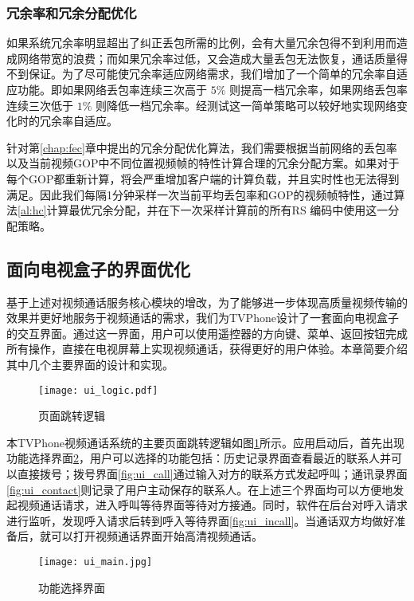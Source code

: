     \subsubsection{冗余率和冗余分配优化}
    如果系统冗余率明显超出了纠正丢包所需的比例，会有大量冗余包得不到利用而造成网络带宽的浪费；而如果冗余率过低，又会造成大量丢包无法恢复，通话质量得不到保证。为了尽可能使冗余率适应网络需求，我们增加了一个简单的冗余率自适应功能。即如果网络丢包率连续三次高于 $5\%$ 则提高一档冗余率，如果网络丢包率连续三次低于 $1\%$ 则降低一档冗余率。经测试这一简单策略可以较好地实现网络变化时的冗余率自适应。

    针对第\ref{chap:fec}章中提出的冗余分配优化算法，我们需要根据当前网络的丢包率以及当前视频GOP中不同位置视频帧的特性计算合理的冗余分配方案。如果对于每个GOP都重新计算，将会严重增加客户端的计算负载，并且实时性也无法得到满足。因此我们每隔1分钟采样一次当前平均丢包率和GOP的视频帧特性，通过算法\ref{al:hc}计算最优冗余分配，并在下一次采样计算前的所有RS 编码中使用这一分配策略。


\subsection{面向电视盒子的界面优化}
基于上述对视频通话服务核心模块的增改，为了能够进一步体现高质量视频传输的效果并更好地服务于视频通话的需求，我们为TVPhone设计了一套面向电视盒子的交互界面。通过这一界面，用户可以使用遥控器的方向键、菜单、返回按钮完成所有操作，直接在电视屏幕上实现视频通话，获得更好的用户体验。本章简要介绍其中几个主要界面的设计和实现。

\begin{figure}[htbp]
  \centering
  \texttt{[image: ui\_logic.pdf]}
  \caption{页面跳转逻辑}
  \label{fig:ui_logic}
\end{figure}

本TVPhone视频通话系统的主要页面跳转逻辑如图\ref{fig:ui_logic}所示。应用启动后，首先出现功能选择界面\ref{fig:ui_main}，用户可以选择的功能包括：历史记录界面查看最近的联系人并可以直接拨号；拨号界面\ref{fig:ui_call}通过输入对方的联系方式发起呼叫；通讯录界面\ref{fig:ui_contact}则记录了用户主动保存的联系人。在上述三个界面均可以方便地发起视频通话请求，进入呼叫等待界面等待对方接通。同时，软件在后台对呼入请求进行监听，发现呼入请求后转到呼入等待界面\ref{fig:ui_incall}。当通话双方均做好准备后，就可以打开视频通话界面开始高清视频通话。

\begin{figure}[htbp]
  \centering
  \texttt{[image: ui\_main.jpg]}
  \caption{功能选择界面}
  \label{fig:ui_main}
\end{figure}

